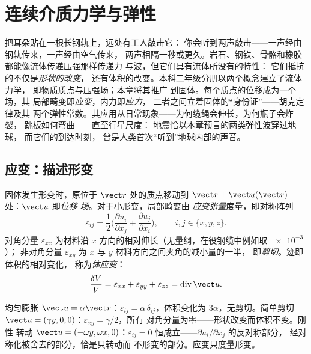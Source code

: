 \chapter{连续介质力学与弹性}\label{ch:b3:continuum-elasticity}

把耳朵贴在一根长钢轨上，远处有工人敲击它：
你会听到两声敲击——一声经由钢轨传来，一声经由空气传来，
两声相隔一秒或更久。岩石、钢铁、骨骼和橡胶都能像流体传递压强那样传递力
与波，但它们具有流体所没有的特性：
它们抵抗的不仅是\emph{形状的改变}，
还有体积的改变。本科二年级分册以两个概念建立了流体力学，
即物质质点与压强场；本章将其推广
到固体。每个质点的位移成为一个场，其
局部畸变即\emph{应变}，内力即\emph{应力}，
二者之间立着固体的“身份证”——胡克定律及其
两个弹性常数。其应用从日常现象——为何缆绳会伸长，为何瓶子会炸裂，
跳板如何弯曲——直至行星尺度：
地震恰以本章预言的两类弹性波穿过地球，
而它们的到达时刻，
曾是人类首次“听到”地球内部的声音。

\section{应变：描述形变}

\begin{definition}[位移场与应变张量]\label{def:b3:continuum-elasticity:strain}
固体发生形变时，原位于 $\vect r$ 处的质点移动到
$\vect r + \vect u(\vect r)$ 处：$\vect u$ 即\emph{位移
场}。对于小形变，局部畸变由
\emph{应变张量}度量，即对称阵列
\[
\varepsilon_{ij} = \frac12\Big(
 \frac{\partial u_i}{\partial x_j} + \frac{\partial u_j}{\partial x_i}
\Big) , \qquad i, j \in \{x, y, z\} .
\]
对角分量 $\varepsilon_{xx}$ 为材料沿
$x$ 方向的相对伸长（无量纲，在役钢缆中例如取 $\num{e-3}$）；
非对角分量 $\varepsilon_{xy}$ 为
$x$ 与 $y$ 材料方向之间夹角的减小量的一半，
即\emph{剪切}。迹即体积的相对变化，
称为\emph{体应变}：
\[
\frac{\delta V}{V} = \varepsilon_{xx} + \varepsilon_{yy} +
\varepsilon_{zz} = \operatorname{div}\vect u .
\]
\end{definition}

\begin{example}[三种基本形变]\label{ex:b3:continuum-elasticity:elementary}
均匀膨胀 $\vect u = \alpha\vect r$：$\varepsilon_{ij} =
\alpha\,\delta_{ij}$，体积变化为 $3\alpha$，无剪切。简单剪切
$\vect u = (\gamma y, 0, 0)$：$\varepsilon_{xy} = \gamma/2$，所有
对角分量为零——形状改变而体积不变。刚性
转动 $\vect u = (-\omega y, \omega x, 0)$：$\varepsilon_{ij} = 0$
恒成立——$\partial u_i/\partial x_j$ 的反对称部分，
经对称化被舍去的部分，恰是只转动而
不形变的部分。应变只度量形变。
\end{example}

